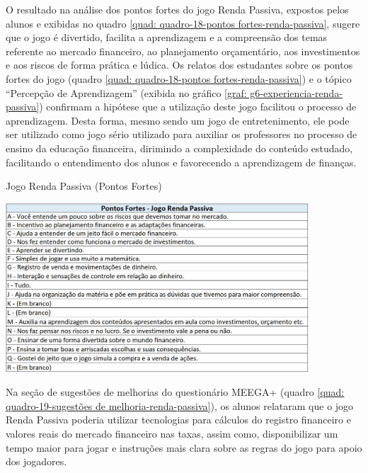 O resultado na análise dos pontos fortes do jogo Renda Passiva, expostos pelos alunos e exibidas no quadro \ref{quad: quadro-18-pontos fortes-renda-passiva}, sugere que o jogo é divertido, facilita a aprendizagem e a compreensão dos temas referente ao mercado financeiro, ao planejamento orçamentário, aos investimentos e aos riscos de forma prática e lúdica. Os relatos dos estudantes sobre os pontos fortes do jogo (quadro \ref{quad: quadro-18-pontos fortes-renda-passiva}) e o tópico “Percepção de Aprendizagem” (exibida no gráfico \ref{graf: g6-experiencia-renda-passiva}) confirmam a hipótese que a utilização deste jogo facilitou o processo de aprendizagem. Desta forma, mesmo sendo um jogo de entretenimento, ele pode ser utilizado como jogo sério utilizado para auxiliar os professores no processo de ensino da educação financeira, dirimindo a complexidade do conteúdo estudado, facilitando o entendimento dos alunos e favorecendo a aprendizagem de finanças.

\graphicspath{{quadros/}} 
\begin{quadro}[!ht]
\centering
\begin{minipage}{0.8\textwidth}
\caption{Jogo Renda Passiva (Pontos Fortes)}
\centering
\includegraphics[width=0.85\textwidth]{quadro-18-pontos fortes-renda-passiva}
\label{quad: quadro-18-pontos fortes-renda-passiva}
\end{minipage}
\end{quadro}

\newpage
Na seção de sugestões de melhorias do questionário MEEGA+ (quadro \ref{quad: quadro-19-sugestões de melhoria-renda-passiva}), os alunos relataram que o jogo Renda Passiva poderia utilizar tecnologias para cálculos do registro financeiro e valores reais do mercado financeiro nas taxas, assim como, disponibilizar um tempo maior para jogar e instruções mais clara sobre as regras do jogo para apoio dos jogadores.


